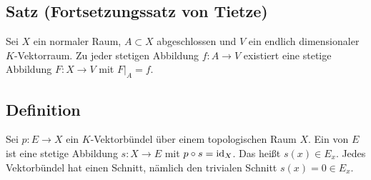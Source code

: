 \subsection{Satz (Fortsetzungssatz von Tietze)} %
\label{sub:26}
Sei $X$ ein normaler Raum, $A \subset X$ abgeschlossen und $V$ ein endlich dimensionaler $K$-Vektorraum. Zu jeder stetigen Abbildung $f \colon A \to V$ existiert eine 
stetige Abbildung $F \colon X \to V$ mit $F|_A=f$.

\subsection*{Definition}
Sei $p \colon E \to X$ ein $K$-Vektorbündel über einem topologischen Raum $X$. Ein  von $E$ ist eine stetige Abbildung $s \colon X \to E$ mit 
$p \circ s = \operatorname{id}_X$. Das heißt $s(x) \in E_x$. Jedes Vektorbündel hat einen Schnitt, nämlich den trivialen Schnitt $s(x)=0 \in E_x$.

